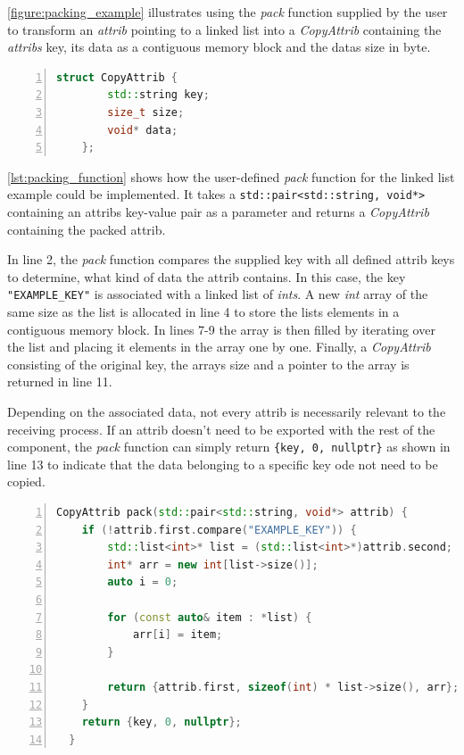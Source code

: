 \autoref{figure:packing_example} illustrates using the \emph{pack} function supplied by the user
to transform an \emph{attrib} pointing to a linked list into a \emph{CopyAttrib} containing the \emph{attribs} key,
its data as a contiguous memory block and the datas size in byte.

\begin{lstlisting}[language=c++, numbers=left, caption=CopyAttrib Struct, captionpos=b, label={lst:copyattrib}]
    struct CopyAttrib {
        std::string key;
        size_t size;
        void* data;
    };
\end{lstlisting}

\autoref{lst:packing_function} shows how the user-defined \emph{pack} function for the linked list example could be implemented.
It takes a \lstinline|std::pair<std::string, void*>| containing an attribs key-value pair as a parameter and returns a \emph{CopyAttrib} containing the packed attrib.

In line 2, the \emph{pack} function compares the supplied key with all defined attrib keys to determine, what kind of data the attrib contains.
In this case, the key \lstinline|"EXAMPLE_KEY"| is associated with a linked list of \emph{ints}.
A new \emph{int} array of the same size as the list is allocated in line 4 to store the lists elements in a contiguous memory block.
In lines 7-9 the array is then filled by iterating over the list and placing it elements in the array one by one.
Finally, a \emph{CopyAttrib} consisting of the original key, the arrays size and a pointer to the array is returned in line 11.

Depending on the associated data, not every attrib is necessarily relevant to the receiving process.
If an attrib doesn't need to be exported with the rest of the component, the \emph{pack} function can simply return \lstinline|{key, 0, nullptr}| as shown in line 13
to indicate that the data belonging to a specific key ode not need to be copied.

\begin{lstlisting}[language=c++, numbers=left, caption=Example Packing Function, captionpos=b, label={lst:packing_function}]
  CopyAttrib pack(std::pair<std::string, void*> attrib) {
    if (!attrib.first.compare("EXAMPLE_KEY")) {
        std::list<int>* list = (std::list<int>*)attrib.second;
        int* arr = new int[list->size()];
        auto i = 0;

        for (const auto& item : *list) {
            arr[i] = item;
        }

        return {attrib.first, sizeof(int) * list->size(), arr};
    }
    return {key, 0, nullptr};
  }
\end{lstlisting}

